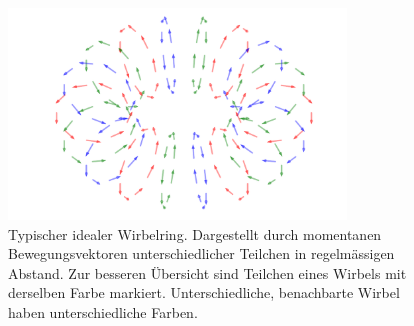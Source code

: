 \begin{figure}
\centering
\includegraphics[width=0.8\textwidth]{papers/wirbelringe/fig/wirbelring_RGB.pdf}
\caption{Typischer idealer Wirbelring. 
Dargestellt durch momentanen Bewegungsvektoren unterschiedlicher Teilchen in regelmässigen Abstand. 
Zur besseren Übersicht sind Teilchen eines Wirbels mit derselben Farbe markiert. 
Unterschiedliche, benachbarte Wirbel haben unterschiedliche Farben. \label{buch:papers:Wirbelringe:fig:generell}}
\end{figure}
